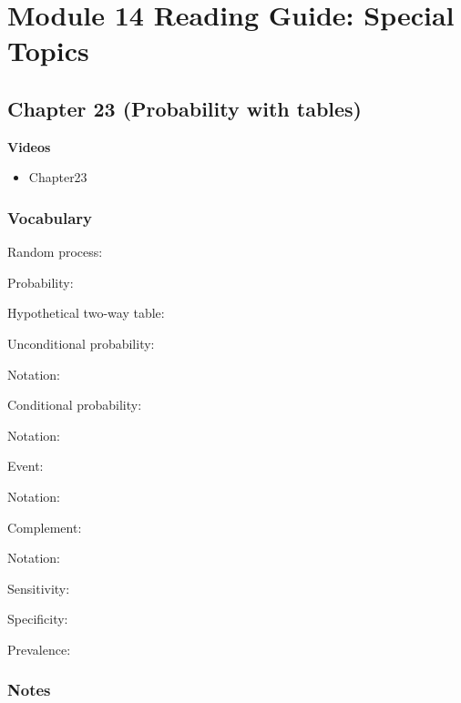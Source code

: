 \documentclass[
]{report}
\providecommand{\tightlist}{%
  \setlength{\itemsep}{0pt}\setlength{\parskip}{0pt}}
\newcommand{\rgs}{\vspace{12pt}} %
\newcommand{\rgi}{\hspace{24pt}}  %
\begin{document}
\hypertarget{module-14-reading-guide-special-topics}{%
\section{Module 14 Reading Guide: Special Topics}\label{module-14-reading-guide-special-topics}}

\hypertarget{chapter-23-probability-with-tables}{%
\subsection*{Chapter 23 (Probability with tables)}\label{chapter-23-probability-with-tables}}


\textbf{Videos}

\begin{itemize}
\tightlist
\item
  Chapter23
\end{itemize}


\hypertarget{vocabulary-4}{%
\subsubsection*{Vocabulary}\label{vocabulary-4}}

Random process:
\rgs

Probability:
\rgs

Hypothetical two-way table:
\rgs

Unconditional probability:
\rgs

\rgi Notation:
\rgs

Conditional probability:
\rgs

\rgi Notation:
\rgs

Event:
\rgs

\rgi Notation:
\rgs

Complement:
\rgs

\rgi Notation:
\rgs

Sensitivity:
\rgs

Specificity:
\rgs

Prevalence:
\rgs

\hypertarget{notes-6}{%
\subsubsection*{Notes}\label{notes-6}}
\end{document}
